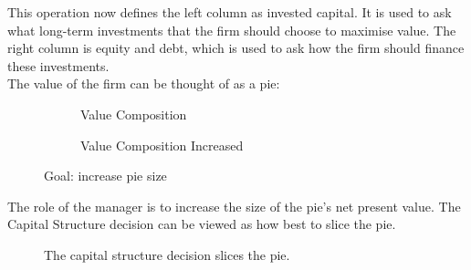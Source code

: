 This operation now defines the left column as invested capital. It is used to ask what long-term investments that the firm should choose to maximise value. The right column is equity and debt, which is used to ask how the firm should finance these investments.\\

The value of the firm can be thought of as a pie:

\begin{figure}[H]
    \centering
    \begin{subfigure}{0.4\textwidth}
        \centering
        \caption{Value Composition}
        \label{fig:value_firm1}
    \end{subfigure}
    \begin{subfigure}{0.4\textwidth}
        \centering
        \caption{Value Composition Increased}
        \label{fig:value_firm2}
    \end{subfigure}
    \caption{Goal: increase pie size }
    \label{fig:value_firm}
\end{figure}

The role of the manager is to increase the size of the pie's net present value. The Capital Structure decision can be viewed as how best to slice the pie.

\begin{figure}[H]
    \centering
    \caption{The capital structure decision slices the pie.}
    \label{fig:debt_equity_circle}
\end{figure}

